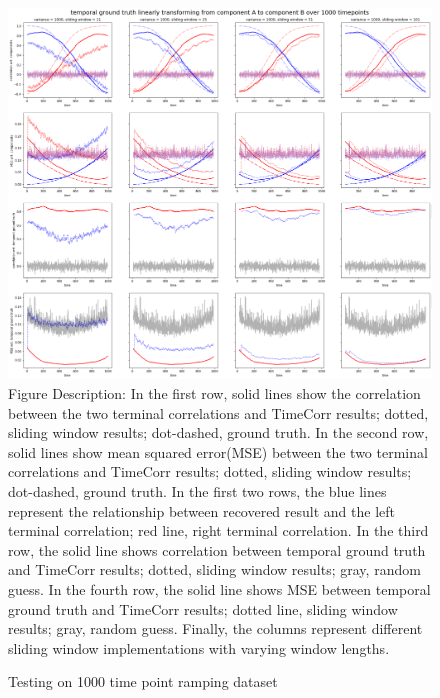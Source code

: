 \documentclass[11pt]{article}
\begin{document}
\begin{figure}[!htb]
\caption{Testing on 1000 time point ramping dataset}
\includegraphics[width=1\textwidth]{../figures/SyntheticTesting/ramp1000t4slide.png}
\label{fig:ramp1000t4slide}
Figure Description: In the first row, solid lines show the correlation between the two terminal correlations and TimeCorr results; dotted, sliding window results; dot-dashed, ground truth. In the second row, solid lines show mean squared error(MSE) between the two terminal correlations and TimeCorr results; dotted, sliding window results; dot-dashed, ground truth. In the first two rows, the blue lines represent the relationship between recovered result and the left terminal correlation; red line, right terminal correlation. In the third row, the solid line shows correlation between temporal ground truth and TimeCorr results; dotted, sliding window results; gray, random guess. In the fourth row, the solid line shows MSE between temporal ground truth and TimeCorr results; dotted line, sliding window results; gray, random guess. Finally, the columns represent different sliding window implementations with varying window lengths.
\end{figure}
\end{document}
